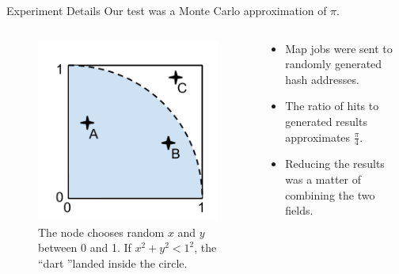 \documentclass[11pt]{beamer}
\begin{document}
\begin{frame}{Experiment Details}
	Our test was a Monte Carlo approximation of $\pi$.
	\begin{columns}[T]
	
	
		\begin{column}{.5\textwidth}
		
			\begin{figure}
			    \includegraphics[width=\linewidth]{figs/dartboard}
			    \caption{The node chooses random $x$ and $y$ between 0 and 1. If $x^{2} + y^{2} < 1^{2} $, the ``dart ''landed inside the circle.}
			    \label{dartboard}
			\end{figure}
			
			
		\end{column}
			
		\begin{column}{.5\textwidth}
			\begin{itemize}
				\item Map jobs were sent to randomly generated hash addresses.
				\item The ratio of hits to generated results approximates $\frac{\pi}{4}$.
				\item Reducing the results was a matter of combining the two fields.
			\end{itemize}
		\end{column}
		
	\end{columns}
\end{frame}
\end{document}

